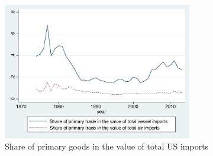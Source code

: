 \documentclass[11pt,twoside, authoryear]{elsarticle}
\begin{document}
\begin{figure}[htbp]
\caption{Share of primary goods in the value of total US imports}
\label{fig:Share_prim_goods}
\begin{center}
\includegraphics[height=6cm]
{Share_of_primary.pdf}
\end{center}
\end{figure}
\end{document}
